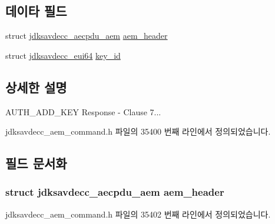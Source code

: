 \subsection*{데이타 필드}
\begin{DoxyCompactItemize}
\item 
struct \hyperlink{structjdksavdecc__aecpdu__aem}{jdksavdecc\+\_\+aecpdu\+\_\+aem} \hyperlink{structjdksavdecc__aem__command__auth__add__key__response_ae1e77ccb75ff5021ad923221eab38294}{aem\+\_\+header}
\item 
struct \hyperlink{structjdksavdecc__eui64}{jdksavdecc\+\_\+eui64} \hyperlink{structjdksavdecc__aem__command__auth__add__key__response_a37cbdf6056556ccfaee3ab01dc7c3032}{key\+\_\+id}
\end{DoxyCompactItemize}


\subsection{상세한 설명}
A\+U\+T\+H\+\_\+\+A\+D\+D\+\_\+\+K\+EY Response -\/ Clause 7... 

jdksavdecc\+\_\+aem\+\_\+command.\+h 파일의 35400 번째 라인에서 정의되었습니다.



\subsection{필드 문서화}
\subsubsection[{\texorpdfstring{aem\+\_\+header}{aem_header}}]{\setlength{\rightskip}{0pt plus 5cm}struct {\bf jdksavdecc\+\_\+aecpdu\+\_\+aem} aem\+\_\+header}\hypertarget{structjdksavdecc__aem__command__auth__add__key__response_ae1e77ccb75ff5021ad923221eab38294}{}\label{structjdksavdecc__aem__command__auth__add__key__response_ae1e77ccb75ff5021ad923221eab38294}


jdksavdecc\+\_\+aem\+\_\+command.\+h 파일의 35402 번째 라인에서 정의되었습니다.

